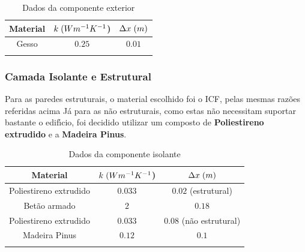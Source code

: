 \documentclass[12pt, a4paper]{article}
\begin{document}
\begin{table}[htpb]
    \begin{center}
        \begin{tabular}{c c c}
            \toprule{}
            Material & $ k \hspace{1mm} (Wm^{-1}K^{-1}$) & $ \Delta x \hspace{1mm} (m)$ \\
            \midrule{}
            Gesso & $0.25$ & $0.01$ \\
            \bottomrule{}
        \end{tabular}
    \end{center}
    \caption{Dados da componente exterior}\label{tab:parede_int_ext}
\end{table}


\subsubsection{Camada Isolante e Estrutural}\label{ssub:paredes_int_isolante}


Para as paredes estruturais, o material escolhido foi o ICF, pelas mesmas raz\~oes referidas
acima %
J\'a para as n\~ao estruturais, como estas n\~ao necessitam suportar bastante o edif\'{\i}cio,
foi decidido utilizar um composto de \textbf{Poliestireno extrudido} e a \textbf{Madeira Pinus}.



\begin{table}[htpb]
    \begin{center}
        \begin{tabular}{c c c}
            \toprule{}
            Material & $ k \hspace{1mm} (Wm^{-1}K^{-1}$) & $ \Delta x \hspace{1mm} (m)$ \\
            \midrule{}
            Poliestireno extrudido & $0.033$ & $0.02$ (estrutural) \\
            \midrule{}
            Bet\~ao armado & $2$ & $0.18$ \\
            \midrule{}
            Poliestireno extrudido & $0.033$ & $0.08$ (n\~ao estrutural) \\
            \midrule{}
            Madeira Pinus & $0.12$ & $0.1$ \\
            \bottomrule{}
        \end{tabular}
    \end{center}
    \caption{Dados da componente isolante}\label{tab:parede_int_iso}
\end{table}
\end{document}

